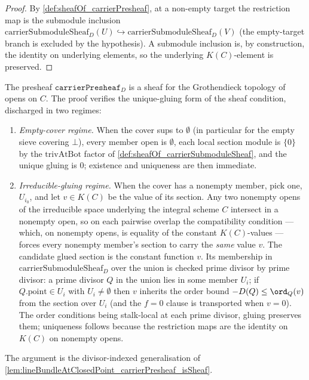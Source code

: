 \begin{proof}
  By \cref{def:sheafOf_carrierPresheaf}, at a non-empty target the restriction
  map is the submodule inclusion
  \(\mathrm{carrierSubmoduleSheaf}_D(U) \hookrightarrow
  \mathrm{carrierSubmoduleSheaf}_D(V)\) (the empty-target branch is excluded by
  the hypothesis). A submodule inclusion is, by construction, the identity on
  underlying elements, so the underlying \(K(C)\)-element is preserved.
\end{proof}

\begin{lemma}

  \label{lem:sheafOf_carrierPresheaf_isSheaf}
  The presheaf \(\texttt{carrierPresheaf}_D\) is a sheaf for the
  Grothendieck topology of opens on \(C\). The proof verifies the
  unique-gluing form of the sheaf condition, discharged in two
  regimes:
  \begin{enumerate}
    \item \emph{Empty-cover regime.} When the cover sups to \(\emptyset\)
      (in particular for the empty sieve covering \(\bot\)), every member
      open is \(\emptyset\), each local section module is \(\{0\}\) by the
      \(\mathrm{trivAtBot}\) factor of
      \cref{def:sheafOf_carrierSubmoduleSheaf}, and the unique gluing is
      \(0\); existence and uniqueness are then immediate.
    \item \emph{Irreducible-gluing regime.} When the cover has a nonempty
      member, pick one, \(U_{i_0}\), and let \(v \in K(C)\) be the value of
      its section. Any two nonempty opens of the irreducible space
      underlying the integral scheme \(C\) intersect in a nonempty open, so
      on each pairwise overlap the compatibility condition — which, on
      nonempty opens, is equality of the constant \(K(C)\)-values — forces
      every nonempty member's section to carry the \emph{same} value \(v\).
      The candidate glued section is the constant function \(v\). Its
      membership in \(\mathrm{carrierSubmoduleSheaf}_D\) over the union is
      checked prime divisor by prime divisor: a prime divisor \(Q\) in the
      union lies in some member \(U_i\); if \(Q.\mathrm{point} \in U_i\)
      with \(U_i \ne \emptyset\) then \(v\) inherits the order bound
      \(-D(Q) \le \ord_Q(v)\) from the section over \(U_i\) (and the
      \(f = 0\) clause is transported when \(v = 0\)). The order conditions
      being stalk-local at each prime divisor, gluing preserves them;
      uniqueness follows because the restriction maps are the identity on
      \(K(C)\) on nonempty opens.
  \end{enumerate}
  The argument is the divisor-indexed generalisation of
  \cref{lem:lineBundleAtClosedPoint_carrierPresheaf_isSheaf}.
\end{lemma}

